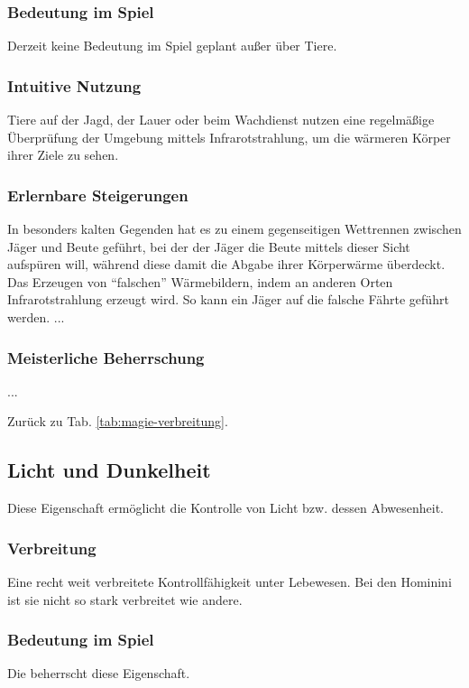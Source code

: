 \subsubsection{Bedeutung im Spiel}
Derzeit keine Bedeutung im Spiel geplant außer über Tiere.

\subsubsection{Intuitive Nutzung}
Tiere auf der Jagd, der Lauer oder beim Wachdienst nutzen eine regelmäßige Überprüfung der Umgebung mittels Infrarotstrahlung, um die wärmeren Körper ihrer Ziele zu sehen.


\subsubsection{Erlernbare Steigerungen}
\begin{outline}
	\1 In besonders kalten Gegenden hat es zu einem gegenseitigen Wettrennen zwischen Jäger und Beute geführt, bei der der Jäger die Beute mittels dieser Sicht aufspüren will, während diese damit die Abgabe ihrer Körperwärme überdeckt.
	\1 Das Erzeugen von "`falschen"' Wärmebildern, indem an anderen Orten Infrarotstrahlung erzeugt wird.
	So kann \zB ein Jäger auf die falsche Fährte geführt werden.
	\1 ...
\end{outline}

\subsubsection{Meisterliche Beherrschung} 
\begin{outline}
	\1 ...
\end{outline}
Zurück zu Tab. \ref{tab:magie-verbreitung}.



\subsection{Licht und Dunkelheit} \label{magie:licht}
Diese Eigenschaft ermöglicht die Kontrolle von Licht bzw. dessen Abwesenheit.

\subsubsection{Verbreitung}
Eine recht weit verbreitete Kontrollfähigkeit unter Lebewesen. 
Bei den Hominini ist sie nicht so stark verbreitet wie andere.

\subsubsection{Bedeutung im Spiel}
Die  beherrscht diese Eigenschaft. 

